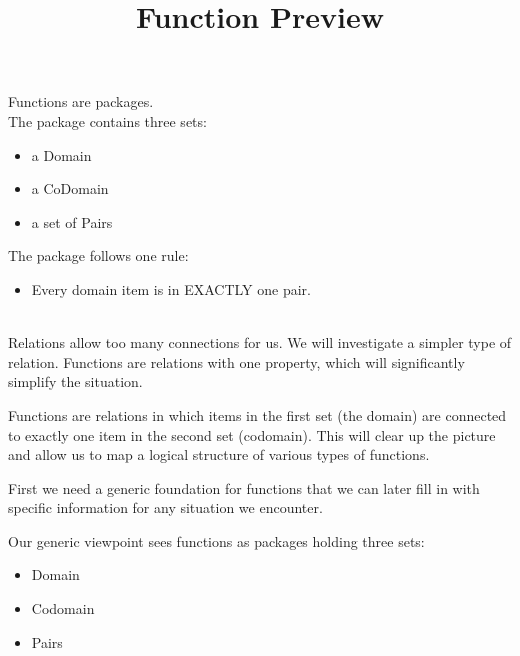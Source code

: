 \documentclass{ximera}
\title{Function Preview}
\begin{document}
\begin{abstract}
\end{abstract}

\maketitle





\begin{sectionOutcomes}

Functions are packages. \\
The package contains three sets:

\begin{itemize}
\item a Domain
\item a CoDomain
\item a set of Pairs
\end{itemize}

The package follows one rule:
\begin{itemize}
\item Every domain item is in EXACTLY one pair.
\end{itemize}

\end{sectionOutcomes}




\quad \\


Relations allow too many connections for us.  We will investigate a simpler type of relation. Functions are relations with one property, which will significantly simplify the situation.

Functions are relations in which items in the first set (the domain) are connected to exactly one item in the second set (codomain).  This will clear up the picture and allow us to map a logical structure of various types of functions.

First we need a generic foundation for functions that we can later fill in with specific information for any situation we encounter. 

Our generic viewpoint sees functions as packages holding three sets:
\begin{itemize}
\item Domain 
\item Codomain 
\item Pairs
\end{itemize}
\end{document}
